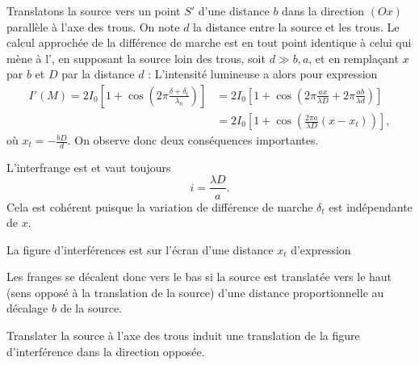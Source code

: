 \documentclass[12pt,fancy]{cours}
\begin{document}
Translatons la source vers un point $S'$ d'une distance $b$ dans la direction $(Ox)$ parallèle à l'axe des trous. On note $d$ la distance entre la source et les trous. Le calcul approchée de la différence de marche est en tout point identique à celui qui mène à l', en supposant la source loin des trous, soit $d \gg b,a$, et en remplaçant $x$ par $b$ et $D$ par la distance $d$ :
L'intensité lumineuse a alors pour expression 
\begin{align}
  I'(M)= 2I_0\left[1 + \cos\left(2\pi \frac{\delta + \delta_t}{\lambda_0}\right)\right] & = 2I_0\left[1 + \cos\left(2\pi \frac{ax}{\lambda D} + 2\pi \frac{ab}{\lambda d}\right)\right] \\ & = 2I_0\left[1 + \cos\left(\frac{2\pi a}{\lambda D}(x - x_t)\right)\right],
\end{align}
où $x_t = -\frac{bD}{d}$. On observe donc deux conséquences importantes.
\begin{liste}
  \item L’interfrange est  et vaut toujours 
  $$i = \frac{\lambda D}{a}.$$
  Cela est cohérent puisque la variation de différence de marche $\delta_t$ est indépendante de $x$.
  \item La figure d’interférences est  sur l'écran d’une distance $x_t$ d'expression 
\end{liste}
%
Les franges se décalent donc vers le bas si la source est translatée vers le haut (sens opposé à la translation de la source) d’une distance proportionnelle au décalage $b$ de la source.

\begin{prop}\label{prop:translat_perp}
Translater la source  à l'axe des trous induit une translation de la figure d’interférence dans la direction opposée.
\end{prop}
\end{document}
